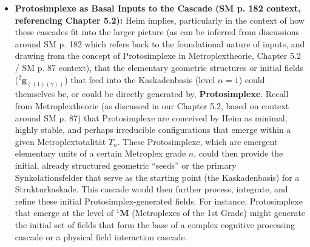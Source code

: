 \documentclass[12pt]{article}
\newcommand{\q}[1]{\enquote{#1}}
\newcommand{\metroplex}[1]{{}^{#1}\mathbf{M}}
\newcommand{\hypersyntrix}{\metroplex{1}}
\newcommand{\metroplextotalitaet}[1]{T_{#1}}
\newcommand{\partialstruktur}[1]{{}^2\mathbf{g}_{(#1)}} %
\newcommand{\kaskadenstufe}{\alpha}
\begin{document}
\begin{itemize}
    \item \textbf{Protosimplexe as Basal Inputs to the Cascade (SM p. 182 context, referencing Chapter 5.2):}
    Heim implies, particularly in the context of how these cascades fit into the larger picture (as can be inferred from discussions around SM p. 182 which refers back to the foundational nature of inputs, and drawing from the concept of Protosimplexe in Metroplextheorie, Chapter 5.2 / SM p. 87 context), that the elementary geometric structures or initial fields (\( \partialstruktur{(1)(\gamma)} \)) that feed into the Kaskadenbasis (level \( \kaskadenstufe=1 \)) could themselves be, or could be directly generated by, \textbf{Protosimplexe}. Recall from Metroplextheorie (as discussed in our Chapter 5.2, based on context around SM p. 87) that Protosimplexe are conceived by Heim as minimal, highly stable, and perhaps irreducible configurations that emerge within a given Metroplextotalität \( \metroplextotalitaet{n} \). These Protosimplexe, which are emergent elementary units of a certain Metroplex grade \(n\), could then provide the initial, already structured geometric \q{seeds} or the primary Synkolationsfelder that serve as the starting point (the Kaskadenbasis) for a Strukturkaskade. This cascade would then further process, integrate, and refine these initial Protosimplex-generated fields. For instance, Protosimplexe that emerge at the level of \( \hypersyntrix \) (Metroplexes of the 1st Grade) might generate the initial set of fields that form the base of a complex cognitive processing cascade or a physical field interaction cascade.


\end{itemize}
\end{document}
